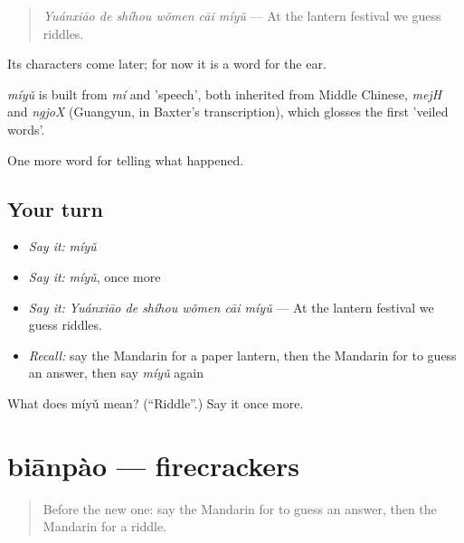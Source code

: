 \begin{quote}
\emph{Yuánxiāo de shíhou wǒmen cāi míyǔ} — At the lantern festival we guess riddles.
\end{quote}

Its characters come later; for now it is a word for the ear.

\begin{cousinweb}
\emph{míyǔ} is built from \emph{mí} and  'speech', both inherited from Middle Chinese, \emph{mejH} and \emph{ngjoX} (Guangyun, in Baxter's transcription), which glosses the first 'veiled words'.
\end{cousinweb}

\begin{grammarlens}[title={What you've built}]
One more word for telling what happened.
\end{grammarlens}

\subsection*{Your turn}
\begin{itemize}
\raggedright
  \item \emph{Say it:} \emph{míyǔ}
  \item \emph{Say it:} \emph{míyǔ}, once more
  \item \emph{Say it:} \emph{Yuánxiāo de shíhou wǒmen cāi míyǔ} — At the lantern festival we guess riddles.
  \item \emph{Recall:} say the Mandarin for a paper lantern, then the Mandarin for to guess an answer, then say \emph{míyǔ} again
\end{itemize}

\begin{tcolorbox}[breakable,colback=teal!4,colframe=teal!35!black,title={Before you move on}]
What does míyǔ mean? (\textquotedblleft{}Riddle\textquotedblright{}.) Say it once more.
\end{tcolorbox}
\section[biānpào]{biānpào — firecrackers}

\label{lesson:ZH-C335-bianpao}



\begin{quote}
Before the new one: say the Mandarin for to guess an answer, then the Mandarin for a riddle.
\end{quote}

